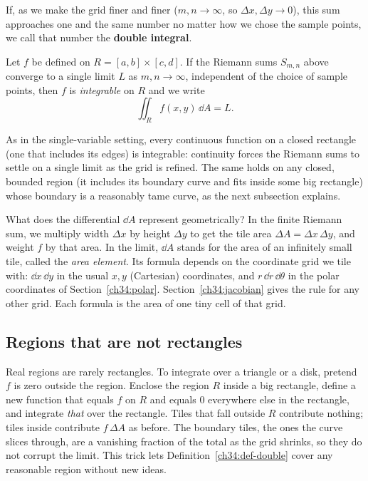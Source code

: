 If, as we make the grid finer and finer ($m,n\to\infty$, so
$\Delta x,\Delta y\to 0$), this sum approaches one and the same number no matter
how we chose the sample points, we call that number the \textbf{double integral}.

\begin{definition}
\label{ch34:def-double}
Let $f$ be defined on $R=[a,b]\times[c,d]$. If the Riemann sums $S_{m,n}$ above
converge to a single limit $L$ as $m,n\to\infty$, independent of the choice of
sample points, then $f$ is \emph{integrable} on $R$ and we write
\[
  \iint_R f(x,y)\,\dd A=L .
\]
\end{definition}

As in the single-variable setting, every continuous function on a closed
rectangle (one that includes its edges) is integrable: continuity forces the
Riemann sums to settle on a single limit as the grid is refined. The same holds
on any closed, bounded region (it includes its boundary curve and fits inside
some big rectangle) whose boundary is a reasonably tame curve, as the next
subsection explains.

\begin{happeningbox}
What does the differential $\dd A$ represent geometrically? In the finite
Riemann sum, we multiply width $\Delta x$ by height $\Delta y$ to get the tile area
$\Delta A=\Delta x\,\Delta y$, and weight $f$ by that area. In the limit, $\dd A$
stands for the area of an infinitely small tile, called the \emph{area element}.
Its formula depends on the coordinate grid we tile with: $\dd x\,\dd y$ in the
usual $x,y$ (Cartesian) coordinates, and $r\,\dd r\,\dd\theta$ in the polar
coordinates of Section~\ref{ch34:polar}. Section~\ref{ch34:jacobian} gives the
rule for any other grid. Each formula is the area of one tiny cell of that grid.
\end{happeningbox}

\subsection{Regions that are not rectangles}

Real regions are rarely rectangles. To integrate over a triangle or a disk,
pretend $f$ is zero outside the region. Enclose the region $R$
inside a big rectangle, define a new function that equals $f$ on $R$ and equals
$0$ everywhere else in the rectangle, and integrate \emph{that} over the
rectangle. Tiles that fall outside $R$ contribute nothing; tiles inside
contribute $f\,\Delta A$ as before. The boundary tiles, the ones the curve slices
through, are a vanishing fraction of the total as the grid shrinks, so they do
not corrupt the limit. This trick lets Definition~\ref{ch34:def-double}
cover any reasonable region without new ideas.

